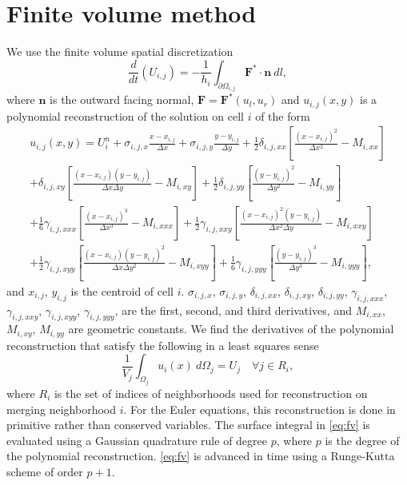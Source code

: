 
\section{Finite volume method}
We use the finite volume spatial discretization 
\begin{equation} \label{eq:fv}
\frac{d}{dt}(U_{i,j}) =  - \frac{1}{h_i} \int_{\partial \Omega_{i,j}} \mathbf{F}^* \cdot \mathbf{n}~dl,
\end{equation}
where $\mathbf{n}$ is the outward facing normal, $\mathbf{F} = \mathbf{F}^*(u_l,u_r)$ and $u_{i,j}(x,y)$ is a polynomial reconstruction of the solution on cell $i$ of the form
\begin{equation}\label{eq:u}
\begin{aligned}
	    u_{i,j}(x,y) = U^n_{i} +  \sigma_{i,j,x}\frac{x- x_{i,j}}{\Delta x} +   \sigma_{i,j,y}\frac{y- y_{i,j}}{\Delta y} + \frac{1}{2} \delta_{i,j, xx}\left[ \frac{(x -  x_{i,j})^2 }{\Delta x^2} -  M_{i,xx}\right]\\
	    + \delta_{i,j, xy}\left[ \frac{(x -  x_{i,j}) (y -  y_{i,j}) }{\Delta x \Delta y} -  M_{i,xy}\right] + \frac{1}{2} \delta_{i,j, yy}\left[ \frac{(y -  y_{i,j})^2 }{\Delta y^2} -   M_{i,yy}\right]\\
	     + \frac{1}{6}\gamma_{i,j, xxx}\left[ \frac{(x -  x_{i,j})^3 }{\Delta x^3} -  M_{i,xxx}\right] + \frac{1}{2}\gamma_{i,j, xxy}\left[ \frac{(x -  x_{i,j})^2 (y -  y_{i,j}) }{\Delta x^2 \Delta y} -  M_{i,xxy}\right]\\
	     + \frac{1}{2}\gamma_{i,j, xyy}\left[ \frac{(x -  x_{i,j}) (y -  y_{i,j})^2 }{\Delta x \Delta y ^2} -  M_{i,xyy}\right]+ \frac{1}{6}\gamma_{i,j, yyy}\left[ \frac{(y -  y_{i,j})^3 }{\Delta y^3} -  M_{i,yyy}\right],
\end{aligned}
\end{equation}
and $ x_{i,j}$, $ y_{i,j}$ is the centroid of cell $i$. $\sigma_{i,j,x}$, $ \sigma_{i,j,y}$, $ \delta_{i,j,xx}$, $ \delta_{i,j,xy}$, $ \delta_{i,j,yy}$, $ \gamma_{i,j,xxx}$, $ \gamma_{i,j,xxy}$, $ \gamma_{i,j,xyy}$, $ \gamma_{i,j,yyy}$, are the first, second, and third derivatives, and $  M_{i,xx}$, $ M_{i,xy}$,  $ M_{i,yy}$ are geometric constants. We find the derivatives of the polynomial reconstruction that satisfy the following in a least squares sense
\begin{equation}\label{eq:qi}
\frac{1}{ V_j}\int_{\Omega_j} u_i(x)~d\Omega_j = U_j \quad \forall j \in R_i,
\end{equation}
where $R_i$ is the set of indices of neighborhoods used for reconstruction on merging neighborhood $i$.  For the Euler equations, this reconstruction is done in primitive rather than conserved variables.  The surface integral in \eqref{eq:fv} is evaluated using a Gaussian quadrature rule of degree $p$, where $p$ is the degree of the polynomial reconstruction.  \eqref{eq:fv} is advanced in time using a Runge-Kutta scheme of order $p+1$.



